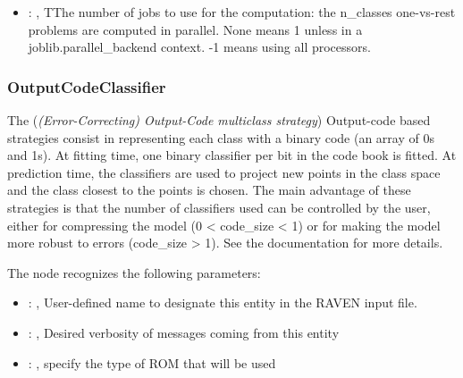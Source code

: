 \begin{itemize}
    \item {}: ,
      TThe number of jobs to use for the computation: the n\_classes one-vs-rest
      problems are computed in parallel. None means 1 unless in a joblib.parallel\_backend
      context. -1 means using all processors.
  \end{itemize}


\subsubsection{OutputCodeClassifier}
  The  (\textit{(Error-Correcting) Output-Code multiclass strategy})
  Output-code based strategies consist in representing each class with a binary code (an array of
  0s and 1s). At fitting time, one binary classifier per bit in the code book is fitted. At
  prediction time, the classifiers are used to project new points in the class space and the class
  closest to the points is chosen. The main advantage of these strategies is that the number of
  classifiers used can be controlled by the user, either for compressing the model
  (0 < code\_size < 1) or for making the model more robust to errors (code\_size > 1). See the
  documentation for more details.

  The  node recognizes the following parameters:
    \begin{itemize}
      \item {}: ,
        User-defined name to designate this entity in the RAVEN input file.
      \item {}: ,
        Desired verbosity of messages coming from this entity
      \item {}: ,
        specify the type of ROM that will be used
  \end{itemize}

